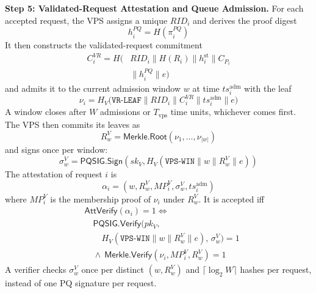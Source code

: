 \documentclass[lettersize,journal]{IEEEtran}
\begin{document}
\medskip
\noindent\textbf{Step 5: Validated-Request Attestation and Queue
Admission.}
For each accepted request, the VPS assigns a unique $RID_i$ and derives
the proof digest
\begin{equation}
h_i^{PQ}=H(\pi_i^{PQ})
\end{equation}
It then constructs the validated-request commitment
\begin{equation}
\begin{aligned}
C_i^{VR}
=
H\big(&RID_i\parallel H(R_i)
\parallel h_i^{\mathrm{st}}
\parallel C_{P_i}\\
&\parallel h_i^{PQ}
\parallel e\big)
\end{aligned}
\label{eq:cvr}
\end{equation}
and admits it to the current admission window $w$ at time
$ts_i^{\mathrm{adm}}$ with the leaf
\begin{equation}
\nu_i=
H_V\big(\texttt{VR-LEAF}\parallel RID_i\parallel C_i^{VR}
\parallel ts_i^{\mathrm{adm}}\parallel e\big)
\end{equation}
A window closes after $W$ admissions or $T_{\mathrm{vps}}$
time units, whichever comes first. The VPS then commits its leaves as
\begin{equation}
R_w^{V}=\mathsf{Merkle.Root}(\nu_1,\ldots,\nu_{|w|})
\end{equation}
and signs once per window:
\begin{equation}
\sigma_w^{V}=
\mathsf{PQSIG.Sign}
\left(
sk_V,
H_V(\texttt{VPS-WIN}\parallel w\parallel R_w^{V}\parallel e)
\right)
\end{equation}
The attestation of request $i$ is
\begin{equation}
\alpha_i=(w,R_w^{V},MP_i^{V},\sigma_w^{V},ts_i^{\mathrm{adm}})
\end{equation}
where $MP_i^{V}$ is the membership proof of $\nu_i$ under
$R_w^{V}$. It is accepted iff
\begin{equation}
\begin{aligned}
&\mathsf{AttVerify}(\alpha_i)=1 \iff\\
&\quad \mathsf{PQSIG.Verify}\big(pk_V,\\
&\qquad H_V(\texttt{VPS-WIN}\parallel w\parallel R_w^{V}\parallel e),\,
\sigma_w^{V}\big)=1\\
&\quad \land\ \mathsf{Merkle.Verify}(\nu_i,MP_i^{V},R_w^{V})=1
\end{aligned}
\label{eq:attverify}
\end{equation}
A verifier checks $\sigma_w^{V}$ once per distinct
$(w,R_w^{V})$ and $\lceil\log_2 W\rceil$ hashes per request, instead of
one PQ signature per request.
\end{document}
